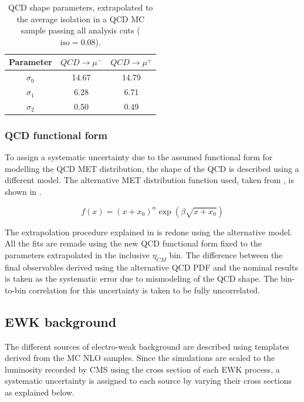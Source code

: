 \begin{table}[!h]
  \begin{center}
  \begin{tabular}{|c|c|c|}\hline
  Parameter & $QCD \to \mu^{-}$ & $QCD \to \mu^{+}$ \\\hline
  $\sigma_{0}$ & 14.67 & 14.79 \\\hline
  $\sigma_{1}$ & 6.28 & 6.71 \\\hline
  $\sigma_{2}$ & 0.50 & 0.49 \\\hline
  \end{tabular}
  \end{center}
  \caption{QCD shape parameters, extrapolated to the average isolation in a QCD MC sample passing all analysis cuts ($\text{iso} = 0.08$).}
  \label{tab:QCDFixedPar_Iso0p08}
\end{table}

\subsubsection{QCD functional form}

To assign a systematic uncertainty due to the assumed functional form for modelling the QCD MET distribution, the shape of the QCD is described using a different model. The alternative MET distribution function used, taken from \cite{HIN-13-007}, is shown in . 

\begin{equation}\label{eq:QCDMultiJet}
f(x) = (x+x_0)^\alpha \exp(\beta\sqrt{x+x_0})
\end{equation}

The extrapolation procedure explained in  is redone using the alternative model. All the fits are remade using the new QCD functional form fixed to the parameters extrapolated in the inclusive $\eta_{CM}$ bin. The difference between the final observables derived using the alternative QCD PDF and the nominal results is taken as the systematic error due to mismodeling of the QCD shape. The bin-to-bin correlation for this uncertainty is taken to be fully uncorrelated.

\subsection{EWK background}

The different sources of electro-weak background are described using templates derived from the MC NLO samples. Since the simulations are scaled to the luminosity recorded by CMS using the cross section of each EWK process, a systematic uncertainty is assigned to each source by varying their cross sections as explained below.

